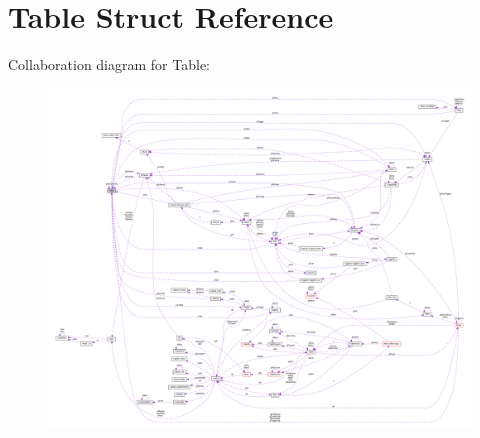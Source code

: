 \hypertarget{structTable}{}\section{Table Struct Reference}
\label{structTable}


Collaboration diagram for Table\+:\nopagebreak
\begin{figure}[H]
\begin{center}
\leavevmode
\includegraphics[width=350pt]{structTable__coll__graph}
\end{center}
\end{figure}
